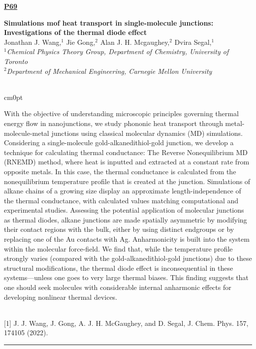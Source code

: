 \documentclass[titlepage,oneside,openany,10pt]{book}
\newenvironment{posterabswrefwfig}[8] %
        {
        \newcommand{\posterref}{#5}
	\FPeval{\cutw}{clip(16.7-#7)}
	\FPeval{\cutl}{round(#8/0.35+1,3)}
	\begin{flushright}
                \underline{\textbf{#4}}
        \end{flushright}
        \textbf{#1}\\%
        #2\\%
        \textit{#3}\\\\%
        \def\windowpagestuff{\centering
                \texttt{[image: \#6]}
	}
        \opencutright
        \begin{cutout}{0}{\cutw cm}{0pt}{\RoundingUpFunction{\cutl}}
        \noindent
	}
	{
	\end{cutout}
	\vspace{0.5cm}
	\\\noindent \posterref \\ \noindent\rule{15cm}{0.5pt}%
        }
\begin{document}
\newpage

\begin{posterabswrefwfig}
	{Simulations mof heat transport in single-molecule junctions: Investigations of the thermal diode effect}
	{Jonathan J. Wang,$^{1}$ Jie Gong,$^{2}$ Alan J. H. Mcgaughey,$^{2}$ Dvira Segal,$^{1}$}
	{
	$^1$Chemical Physics Theory Group, Department of Chemistry, University of Toronto\\
	$^2$Department of Mechanical Engineering, Carnegie Mellon University
	}
	{P69}
	{
	{[1]} J. J. Wang, J. Gong, A. J. H. McGaughey, and D. Segal, J. Chem. Phys. 157, 174105 (2022).
	}
	{abstract_figures/Wang_Jonathan_Oral.png}
	{11.0}
	{5.0}
	With the objective of understanding microscopic principles governing thermal energy flow in nanojunctions, we study phononic heat transport through metal-molecule-metal junctions using classical molecular dynamics (MD) simulations. Considering a single-molecule gold-alkanedithiol-gold junction, we develop a technique for calculating thermal conductance: The Reverse Nonequilibrium MD (RNEMD) method, where heat is inputted and extracted at a constant rate from opposite metals. In this case, the thermal conductance is calculated from the nonequilibrium temperature profile that is created at the junction. Simulations of alkane chains of a growing size display an approximate length-independence of the thermal conductance, with calculated values matching computational and experimental studies. Assessing the potential application of molecular junctions as thermal diodes, alkane junctions are made spatially asymmetric by modifying their contact regions with the bulk, either by using distinct endgroups or by replacing one of the Au contacts with Ag. Anharmonicity is built into the system within the molecular force-field. We find that, while the temperature profile strongly varies (compared with the gold-alkanedithiol-gold junctions) due to these structural modifications, the thermal diode effect is inconsequential in these systems---unless one goes to very large thermal biases. This finding suggests that one should seek molecules with considerable internal anharmonic effects for developing nonlinear thermal devices.
	\label{WangJ}
\end{posterabswrefwfig}

  
\end{document}
